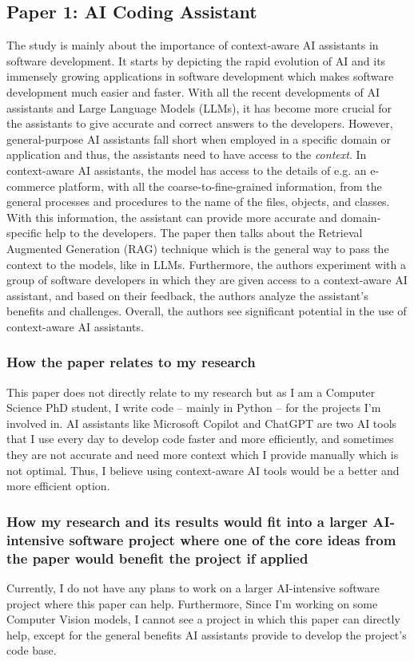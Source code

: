 \documentclass[11pt]{article}
\begin{document}
\subsection{Paper 1: AI Coding Assistant}
The study is mainly about the importance of context-aware AI assistants in software development. It starts by depicting the rapid evolution of AI and its immensely growing applications in software development which makes software development much easier and faster. With all the recent developments of AI assistants and Large Language Models (LLMs), it has become more crucial for the assistants to give accurate and correct answers to the developers. However, general-purpose AI assistants fall short when employed in a specific domain or application and thus, the assistants need to have access to the \textit{context}. In context-aware AI assistants, the model has access to the details of e.g. an e-commerce platform, with all the coarse-to-fine-grained information, from the general processes and procedures to the name of the files, objects, and classes. With this information, the assistant can provide more accurate and domain-specific help to the developers. The paper then talks about the Retrieval Augmented Generation (RAG) technique which is the general way to pass the context to the models, like in LLMs. Furthermore, the authors experiment with a group of software developers in which they are given access to a context-aware AI assistant, and based on their feedback, the authors analyze the assistant's benefits and challenges. Overall, the authors see significant potential in the use of context-aware AI assistants.

\subsubsection{How the paper relates to my research}
This paper does not directly relate to my research but as I am a Computer Science PhD student, I write code -- mainly in Python -- for the projects I'm involved in. AI assistants like Microsoft Copilot and ChatGPT are two AI tools that I use every day to develop code faster and more efficiently, and sometimes they are not accurate and need more context which I provide manually which is not optimal. Thus, I believe using context-aware AI tools would be a better and more efficient option.

\subsubsection{How my research and its results would fit into a larger AI-intensive software project where one of the core ideas from the paper would benefit the project if applied}
Currently, I do not have any plans to work on a larger AI-intensive software project where this paper can help. Furthermore, Since I'm working on some Computer Vision models, I cannot see a project in which this paper can directly help, except for the general benefits AI assistants provide to develop the project's code base.
\end{document}
